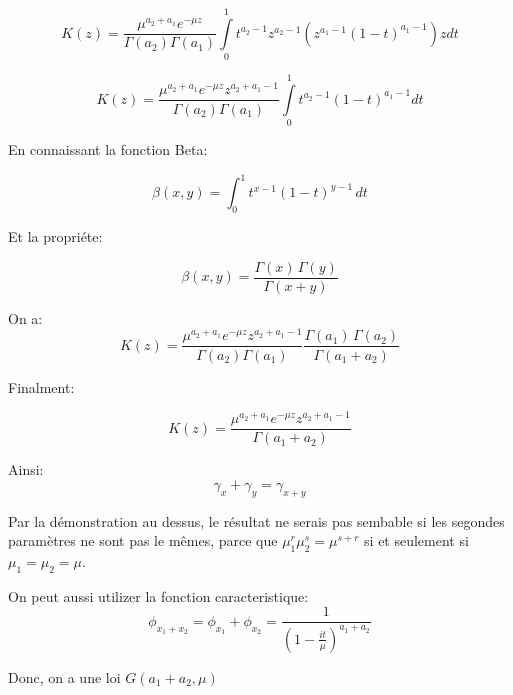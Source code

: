 \documentclass[a4paper]{article}
\begin{document}
\begin{equation}
K(z)=\frac{\mu^{a_2+a_1}e^{-\mu z}}{\Gamma (a_2)\Gamma (a_1)}\int\limits_0^1{t^{a_2-1}z^{a_2-1}}(z^{a_1-1}(1-t)^{a_1-1})zdt
\end{equation}

\begin{equation}
K(z)=\frac{\mu^{a_2+a_1}e^{-\mu z}z^{a_2+a_1-1}}{\Gamma (a_2)\Gamma (a_1)}\int\limits_0^1{t^{a_2-1}}(1-t)^{a_1-1}dt
\end{equation}

En connaissant la fonction Beta:

\begin{equation}
\mathbb{\beta}(x,y) = \int_0^1t^{x-1}(1-t)^{y-1}\,dt
\end{equation}

Et la propriéte:

\begin{equation}
\beta(x,y)=\frac{\Gamma(x)\,\Gamma(y)}{\Gamma(x+y)}
\end{equation}


On a:
\begin{equation}
K(z)=\frac{\mu^{a_2+a_1}e^{-\mu z}z^{a_2+a_1-1}}{\Gamma (a_2)\Gamma (a_1)}\frac{\Gamma(a_1)\,\Gamma(a_2)}{\Gamma(a_1+a_2)}
\end{equation}

Finalment:

\begin{equation}
K(z)=\frac{\mu^{a_2+a_1}e^{-\mu z}z^{a_2+a_1-1}}{\Gamma(a_1+a_2)}
\end{equation}

Ainsi:
\begin{equation}
\gamma_{x}+\gamma_{y}=\gamma_{x+y}
\end{equation}

Par la démonstration au dessus, le résultat ne serais pas sembable si les segondes paramètres ne sont pas le mêmes, parce que 
$\mu_{1}^r \mu_{2}^s = \mu^{s+r}$ si et seulement si $\mu_1=\mu_2=\mu$.

On peut aussi utilizer la fonction caracteristique:
\begin{equation}
\phi_{x_1+x_2}=\phi_{x_1}+\phi_{x_2}=\frac{1}{(1-\frac{it}{\mu})^{a_1+a_2}}
\end{equation}

Donc, on a une loi $G(a_1+a_2,\mu)$



\subsection{}
\end{document}
